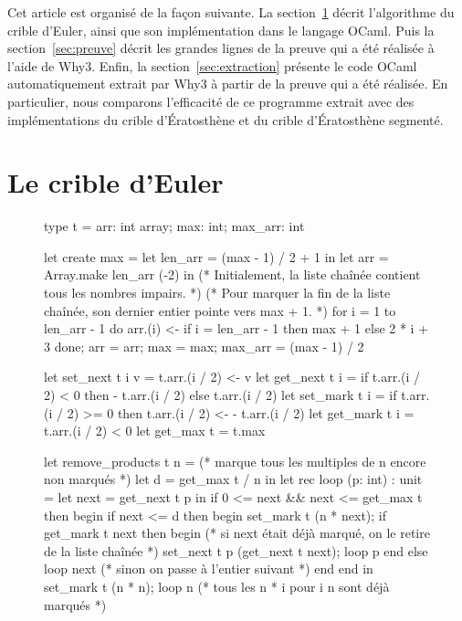 \documentclass[a4paper]{easychair}
\begin{document}
Cet article est organisé de la façon suivante.
La section~\ref{sec:algo} décrit l'algorithme du crible d'Euler, ainsi que son
implémentation dans le langage OCaml.
Puis la section~\ref{sec:preuve} décrit les grandes lignes de la preuve qui a
été réalisée à l'aide de Why3.
Enfin, la section~\ref{sec:extraction} présente le code OCaml
automatiquement extrait par Why3 à partir
de la preuve qui a été réalisée. En particulier, nous comparons l'efficacité
de ce programme extrait avec des implémentations du crible d'Ératosthène et
du crible d'Ératosthène segmenté.

\section{Le crible d'Euler}
\label{sec:algo}

\begin{figure}[tp]
\begin{ocaml}
type t = { arr: int array; max: int; max_arr: int }

let create max =
  let len_arr = (max - 1) / 2 + 1 in
  let arr = Array.make len_arr (-2) in
  (* Initialement, la liste chaînée contient tous les nombres impairs. *)
  (* Pour marquer la fin de la liste chaînée, son dernier entier pointe vers max + 1. *)
  for i = 1 to len_arr - 1 do
    arr.(i) <- if i = len_arr - 1 then max + 1 else 2 * i + 3
  done;
  { arr = arr; max = max; max_arr = (max - 1) / 2 }

let set_next t i v = t.arr.(i / 2) <- v
let get_next t i = if t.arr.(i / 2) < 0 then - t.arr.(i / 2) else t.arr.(i / 2)
let set_mark t i = if t.arr.(i / 2) >= 0 then t.arr.(i / 2) <- - t.arr.(i / 2)
let get_mark t i = t.arr.(i / 2) < 0
let get_max t = t.max

let remove_products t n =
  (* marque tous les multiples de n encore non marqués *)
  let d = get_max t / n in
  let rec loop (p: int) : unit =
    let next = get_next t p in
    if 0 <= next && next <= get_max t then begin
      if next <= d then begin
        set_mark t (n * next);
        if get_mark t next then begin
          (* si next était déjà marqué, on le retire de la liste chaînée *)
          set_next t p (get_next t next); loop p
        end else loop next (* sinon on passe à l'entier suivant *)
      end end in
  set_mark t (n * n); loop n (* tous les n * i pour i \< n sont déjà marqués *)


\end{ocaml}
\end{figure}
\end{document}
